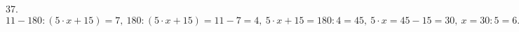 37. $11-180:(5\cdot x+15)=7,\ 180:(5\cdot x+15)=11-7=4,\ 5\cdot x+15=180:4=45,\ 5\cdot x =45-15=30,\ x=30:5=6.$\\
